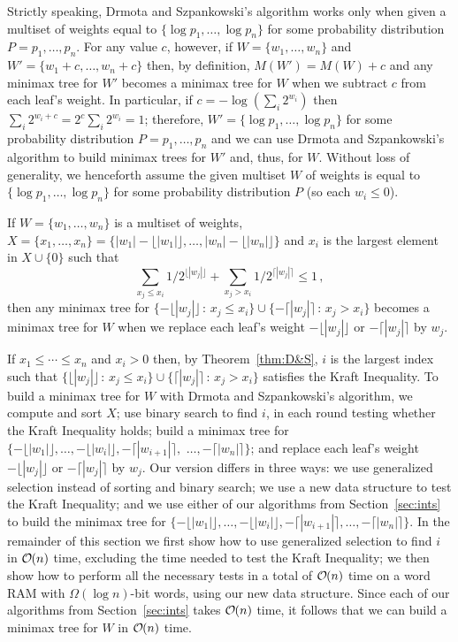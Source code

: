 \documentclass[runningheads]{llncs}
\newcommand{\Oh}[1]
    {\ensuremath{\mathcal{O} \hspace{-.5ex} \left( {#1} \right)}}
\begin{document}
Strictly speaking, Drmota and Szpankowski's algorithm works only when given a multiset of weights equal to \(\{\log p_1, \ldots, \log p_n\}\) for some probability distribution \(P = p_1, \ldots, p_n\).  For any value $c$, however, if \(W = \{w_1, \ldots, w_n\}\) and \(W' = \{w_1 + c, \ldots, w_n + c\}\) then, by definition, \(M (W') = M (W) + c\) and any minimax tree for $W'$ becomes a minimax tree for $W$ when we subtract $c$ from each leaf's weight.  In particular, if \(c = - \log \left( \sum_i 2^{w_i} \right)\) then \(\sum_i 2^{w_i + c} = 2^c \sum_i 2^{w_i} = 1\); therefore, \(W' = \{\log p_1, \ldots, \log p_n\}\) for some probability distribution \(P = p_1, \ldots, p_n\) and we can use Drmota and Szpankowski's algorithm to build minimax trees for $W'$ and, thus, for $W$.  Without loss of generality, we henceforth assume the given multiset $W$ of weights is equal to \(\{\log p_1, \ldots, \log p_n\}\) for some probability distribution $P$ (so each \(w_i \leq 0\)).

\begin{theorem} \label{thm:D&S}
If \(W = \{w_1, \ldots, w_n\}\) is a multiset of weights, \(X = \{x_1, \ldots, x_n\} = \{|w_1| - \lfloor |w_1| \rfloor, \ldots, |w_n| - \lfloor |w_n| \rfloor\}\) and $x_i$ is the largest element in \(X \cup \{0\}\) such that
\[\sum_{x_j \leq x_i} 1 / 2^{\lfloor |w_j| \rfloor} +
    \sum_{x_j > x_i} 1 / 2^{\lceil |w_j| \rceil}
\leq 1\,,\]
then any minimax tree for \(\{- \lfloor |w_j| \rfloor\,:\,x_j \leq x_i\} \cup \{- \lceil |w_j| \rceil\,:\,x_j > x_i\}\) becomes a minimax tree for $W$ when we replace each leaf's weight $- \lfloor |w_j| \rfloor$ or $- \lceil |w_j| \rceil$ by $w_j$.
\end{theorem}

If \(x_1 \leq \cdots \leq x_n\) and \(x_i > 0\) then, by Theorem~\ref{thm:D&S}, $i$ is the largest index such that \(\{\lfloor |w_j| \rfloor\,:\,x_j \leq x_i\} \cup \{\lceil |w_j| \rceil\,:\,x_j > x_i\}\) satisfies the Kraft Inequality.  To build a minimax tree for $W$ with Drmota and Szpankowski's algorithm, we compute and sort $X$; use binary search to find $i$, in each round testing whether the Kraft Inequality holds; build a minimax tree for \(\{- \lfloor |w_1| \rfloor, \ldots, - \lfloor |w_i| \rfloor, - \lceil |w_{i + 1}| \rceil,\) \(\ldots, - \lceil |w_n| \rceil\}\); and replace each leaf's weight $- \lfloor |w_j| \rfloor$ or $- \lceil |w_j| \rceil$ by $w_j$.  Our version differs in three ways: we use generalized selection instead of sorting and binary search; we use a new data structure to test the Kraft Inequality; and we use either of our algorithms from Section~\ref{sec:ints} to build the minimax tree for \(\{- \lfloor |w_1| \rfloor, \ldots, - \lfloor |w_i| \rfloor, - \lceil |w_{i + 1}| \rceil, \ldots, - \lceil |w_n| \rceil\}\).  In the remainder of this section we first show how to use generalized selection to find $i$ in $\Oh{n}$ time, excluding the time needed to test the Kraft Inequality; we then show how to perform all the necessary tests in a total of $\Oh{n}$ time on a word RAM with \(\Omega (\log n)\)-bit words, using our new data structure.  Since each of our algorithms from Section~\ref{sec:ints} takes $\Oh{n}$ time, it follows that we can build a minimax tree for $W$ in $\Oh{n}$ time.
\end{document}
